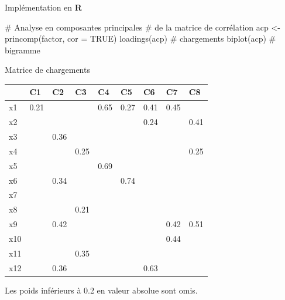 \documentclass[
  ignorenonframetext,
]{beamer}
\newenvironment{Shaded}{\begin{snugshade}}{\end{snugshade}}
\newcommand{\AttributeTok}[1]{\textcolor[rgb]{0.40,0.45,0.13}{#1}}
\newcommand{\CommentTok}[1]{\textcolor[rgb]{0.37,0.37,0.37}{#1}}
\newcommand{\ConstantTok}[1]{\textcolor[rgb]{0.56,0.35,0.01}{#1}}
\newcommand{\FunctionTok}[1]{\textcolor[rgb]{0.28,0.35,0.67}{#1}}
\newcommand{\NormalTok}[1]{\textcolor[rgb]{0.00,0.23,0.31}{#1}}
\newcommand{\OtherTok}[1]{\textcolor[rgb]{0.00,0.23,0.31}{#1}}
\begin{document}
\begin{frame}[fragile]{Implémentation en \textbf{R}}
\protect\hypertarget{impluxe9mentation-en-r}{}
\begin{Shaded}
\begin{Highlighting}[]
\CommentTok{\# Analyse en composantes principales}
\CommentTok{\# de la matrice de corrélation}
\NormalTok{acp }\OtherTok{\textless{}{-}} \FunctionTok{princomp}\NormalTok{(factor, }\AttributeTok{cor =} \ConstantTok{TRUE}\NormalTok{)}
\FunctionTok{loadings}\NormalTok{(acp) }\CommentTok{\# chargements}
\FunctionTok{biplot}\NormalTok{(acp) }\CommentTok{\# bigramme}
\end{Highlighting}
\end{Shaded}
\end{frame}

\begin{frame}{Matrice de chargements}
\protect\hypertarget{matrice-de-chargements}{}
\footnotesize

\begin{table}
\centering
\begin{tabular}{lllllllll}
\toprule
  & C1 & C2 & C3 & C4 & C5 & C6 & C7 & C8\\
\midrule
x1 & 0.21 &  &  & 0.65 & 0.27 & 0.41 & 0.45 & \\
x2 &  &  &  &  &  & 0.24 &  & 0.41\\
x3 &  & 0.36 &  &  &  &  &  & \\
x4 &  &  & 0.25 &  &  &  &  & 0.25\\
x5 &  &  &  & 0.69 &  &  &  & \\
\addlinespace
x6 &  & 0.34 &  &  & 0.74 &  &  & \\
x7 &  &  &  &  &  &  &  & \\
x8 &  &  & 0.21 &  &  &  &  & \\
x9 &  & 0.42 &  &  &  &  & 0.42 & 0.51\\
x10 &  &  &  &  &  &  & 0.44 & \\
\addlinespace
x11 &  &  & 0.35 &  &  &  &  & \\
x12 &  & 0.36 &  &  &  & 0.63 &  & \\
\bottomrule
\end{tabular}
\end{table}

\footnotesize

Les poids inférieurs à 0.2 en valeur absolue sont omis.
\end{frame}
\end{document}

